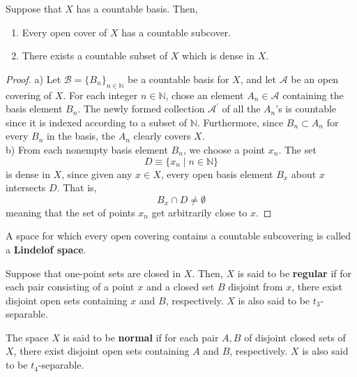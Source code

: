 \documentclass{article}
\begin{document}
    \begin{theorem}
    Suppose that $X$ has a countable basis. Then, 
    \begin{enumerate}
        \item Every open cover of $X$ has a countable subcover. 
        \item There exists a countable subset of $X$ which is dense in $X$. 
    \end{enumerate}
    \end{theorem}
    \begin{proof}
    a) Let $\mathscr{B} = \{B_n\}_{n \in \mathbb{N}}$ be a countable basis for $X$, and let $\mathscr{A}$ be an open covering of $X$. For each integer $n \in \mathbb{N}$, chose an element $A_n \in \mathscr{A}$ containing the basis element $B_n$. The newly formed collection $\mathscr{A}^\prime$ of all the $A_n$'s is countable since it is indexed according to a subset of $\mathbb{N}$. Furthermore, since $B_n \subset A_n$ for every $B_n$ in the basis, the $A_n$ clearly covers $X$. \\
    b) From each nonempty basis element $B_n$, we choose a point $x_n$. The set 
    \[D \equiv \{x_n \; | \; n \in \mathbb{N}\}\]
    is dense in $X$, since given any $x \in X$, every open basis element $B_x$ about $x$ intersects $D$. That is, 
    \[B_x \cap D \neq \emptyset\]
    meaning that the set of points $x_n$ get arbitrarily close to $x$. 
    \end{proof}

    \begin{definition}
    A space for which every open covering contains a countable subcovering is called a \textbf{Lindelof space}. 
    \end{definition}

    \begin{definition}
    Suppose that one-point sets are closed in $X$. Then, $X$ is said to be \textbf{regular} if for each pair consisting of a point $x$ and a closed set $B$ disjoint from $x$, there exist disjoint open sets containing $x$ and $B$, respectively. $X$ is also said to be $t_3$-separable. 
    \end{definition}

    \begin{definition}
    The space $X$ is said to be \textbf{normal} if for each pair $A, B$ of disjoint closed sets of $X$, there exist disjoint open sets containing $A$ and $B$, respectively. $X$ is also said to be $t_4$-separable. 
    \end{definition}
\end{document}
